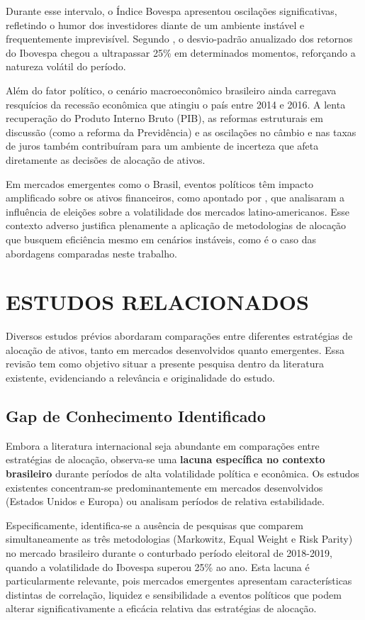 Durante esse intervalo, o Índice Bovespa apresentou oscilações significativas, refletindo o humor dos investidores diante de um ambiente instável e frequentemente imprevisível. Segundo \cite{gregorio2020volatilidade}, o desvio-padrão anualizado dos retornos do Ibovespa chegou a ultrapassar 25\% em determinados momentos, reforçando a natureza volátil do período.

Além do fator político, o cenário macroeconômico brasileiro ainda carregava resquícios da recessão econômica que atingiu o país entre 2014 e 2016. A lenta recuperação do Produto Interno Bruto (PIB), as reformas estruturais em discussão (como a reforma da Previdência) e as oscilações no câmbio e nas taxas de juros também contribuíram para um ambiente de incerteza que afeta diretamente as decisões de alocação de ativos.

Em mercados emergentes como o Brasil, eventos políticos têm impacto amplificado sobre os ativos financeiros, como apontado por \cite{carnahan2020electoral}, que analisaram a influência de eleições sobre a volatilidade dos mercados latino-americanos. Esse contexto adverso justifica plenamente a aplicação de metodologias de alocação que busquem eficiência mesmo em cenários instáveis, como é o caso das abordagens comparadas neste trabalho.

\section{ESTUDOS RELACIONADOS}

Diversos estudos prévios abordaram comparações entre diferentes estratégias de alocação de ativos, tanto em mercados desenvolvidos quanto emergentes. Essa revisão tem como objetivo situar a presente pesquisa dentro da literatura existente, evidenciando a relevância e originalidade do estudo.

\subsection{Gap de Conhecimento Identificado}

Embora a literatura internacional seja abundante em comparações entre estratégias de alocação, observa-se uma \textbf{lacuna específica no contexto brasileiro} durante períodos de alta volatilidade política e econômica. Os estudos existentes concentram-se predominantemente em mercados desenvolvidos (Estados Unidos e Europa) ou analisam períodos de relativa estabilidade. 

Especificamente, identifica-se a ausência de pesquisas que comparem simultaneamente as três metodologias (Markowitz, Equal Weight e Risk Parity) no mercado brasileiro durante o conturbado período eleitoral de 2018-2019, quando a volatilidade do Ibovespa superou 25\% ao ano. Esta lacuna é particularmente relevante, pois mercados emergentes apresentam características distintas de correlação, liquidez e sensibilidade a eventos políticos que podem alterar significativamente a eficácia relativa das estratégias de alocação.

